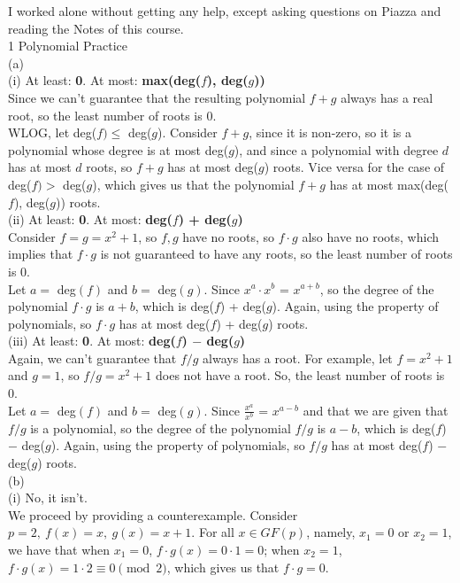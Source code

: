 \documentclass{article}
\begin{document}
I worked alone without getting any help, except asking questions on Piazza and reading the Notes of this course. \\[1cm]
{\Large 1 Polynomial Practice} \\[.5cm]
(a) \\[.1cm]
(i) At least: \textbf{0}. At most: \textbf{max(deg($f$), deg($g$))} \\[.1cm]
\indent Since we can't guarantee that the resulting polynomial $f + g$ always has a real root, so the least number of roots is 0. \\[.1cm]
\indent WLOG, let deg($f) \leq $ deg($g$). Consider $f + g$, since it is non-zero, so it is a polynomial whose degree is at most deg($g$), and since a polynomial with degree $d$ has at most $d$ roots, so $f + g$ has at most deg($g$) roots. Vice versa for the case of deg($f) >$ deg($g$), which gives us that the polynomial $f + g$ has at most max(deg($f$), deg($g$)) roots. \\[.3cm]
(ii) At least: \textbf{0}. At most: \textbf{deg($f$) + deg($g$)} \\[.1cm]
\indent Consider $f = g = x^2 + 1$, so $f, g$ have no roots, so $f\cdot g$ also have no roots, which implies that $f\cdot g$ is not guaranteed to have any roots, so the least number of roots is 0. \\[.1cm]
\indent Let $a =$ deg$(f)$ and $b =$ deg$(g)$. Since $x^a\cdot x^b$ = $x^{a+b}$, so the degree of the polynomial $f\cdot g$ is $a + b$, which is deg($f$) + deg($g$). Again, using the property of polynomials, so $f\cdot g$ has at most deg($f$) + deg($g$) roots. \\[.3cm]
(iii) At least: \textbf{0}. At most: \textbf{deg($f$) $-$ deg($g$)} \\[.1cm]
\indent Again, we can't guarantee that $f/g$ always has a root. For example, let $f = x^2 + 1$ and $g = 1$, so $f/g = x^2 + 1$ does not have a root. So, the least number of roots is 0. \\[.1cm]
\indent Let $a =$ deg$(f)$ and $b =$ deg$(g)$. Since $\frac{x^a}{x^b}$ = $x^{a-b}$ and that we are given that $f/g$ is a polynomial, so the degree of the polynomial $f/g$ is $a - b$, which is deg($f$) $-$ deg($g$). Again, using the property of polynomials, so $f/g$ has at most deg($f$) $-$ deg($g$) roots. \\[.5cm]
(b) \\[.1cm]
(i) No, it isn't. \\[.1cm]
\indent We proceed by providing a counterexample. Consider $p = 2,\ f(x) = x,\ g(x) = x + 1$. For all $x\in GF(p)$, namely, $x_1 = 0$ or $x_2 = 1$, we have that when $x_1 = 0$, $f\cdot g(x) = 0\cdot1 = 0$; when $x_2 = 1$, $f\cdot g(x) = 1\cdot2\equiv0\pmod{2}$, which gives us that $f\cdot g = 0$. \\[.1cm]
\end{document}
